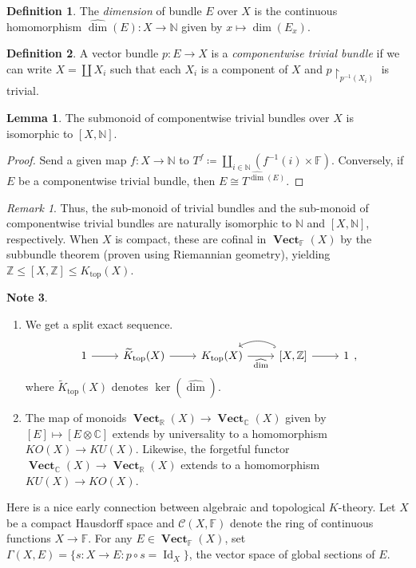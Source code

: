 \documentclass[10pt,letterpaper,cm]{nupset}
\theoremstyle{definition}
\newtheorem{definition}{Definition}
\newtheorem{note}[definition]{Note}
\theoremstyle{theorem}
\newtheorem{lemma}[theorem]{Lemma}
\theoremstyle{remark}
\newtheorem{remark}{Remark}
\newcommand{\C}{\mathbb C}
\newcommand{\F}{\mathbb F}
\newcommand{\N}{\mathbb N}
\newcommand{\R}{\mathbb R}
\newcommand{\Z}{\mathbb Z}
\newcommand{\1}{\mathbf{1}}
\newcommand{\0}{\vec 0}
\DeclareMathOperator{\id}{Id}
\DeclareMathOperator{\vect}{\mathbf{Vect}}
\DeclareMathOperator{\topp}{\mathrm{top}}
\begin{document}
\begin{definition}
The \textit{dimension} of bundle $E$ over $X$ is the continuous homomorphism $\widehat{\dim}(E) : X \to \N$ given by $x \mapsto \dim(E_x)$.
\end{definition}

\begin{definition}
A vector bundle $p: E \to X$ is a \textit{componentwise trivial bundle} if we can write $X =\coprod X_i$ such that each $X_i$ is a component of $X$ and $p\restriction_{p^{{-}1}(X_i)}$ is trivial. 
\end{definition}
\begin{lemma}
The submonoid of componentwise trivial bundles over $X$ is isomorphic to $[X, \N]$.
\end{lemma}
\begin{proof}
Send a given map $f: X \to \N$ to $T^f \coloneqq \coprod_{i \in \N} (f^{{-}1}(i) \times \F)$. Conversely, if $E$ be a componentwise trivial bundle, then $E \cong T^{\widehat{\dim}(E)}$.
\end{proof}

\begin{remark}
Thus, the sub-monoid  of trivial bundles and the sub-monoid of componentwise trivial bundles are naturally isomorphic to $\N$ and $[X, \N]$, respectively.  When $X$ is compact, these are cofinal in $\vect_{\F}(X)$ by the subbundle theorem (proven using Riemannian geometry), yielding $\Z \leq [X, \Z] \leq K_{\topp}(X)$.
\end{remark}

\begin{note} $ $
\begin{enumerate}
\item We get a split exact sequence. 
\[
\begin{tikzcd}
1 \arrow[r] & \widetilde{K}_{\topp}(X) \arrow[r] & K_{\topp}(X) \arrow[r, "\widehat{\dim}"'] & {[X, \mathbb Z]} \arrow[r] \arrow[l, hook, bend right] & 1
\end{tikzcd},
\] where $\widetilde{K}_{\topp}(X)$ denotes $\ker\left(\widehat{\dim}\right)$.
\item The map of monoids $\vect_{\R}(X) \to \vect_{\C}(X)$ given by $[E] \mapsto [E \otimes \C]$ extends by universality to a homomorphism $KO(X) \to KU(X)$. Likewise, the forgetful functor $\vect_{\C}(X) \to \vect_{\R}(X)$ extends to a homomorphism $KU(X) \to KO(X)$.
\end{enumerate}
\end{note}

Here is a nice early connection between algebraic and topological $K$-theory. Let $X$ be a compact Hausdorff space and $\mathcal C(X, \F)$ denote the ring of continuous functions $X \to \F$. For any $E \in \vect_{\F}(X)$, set $\Gamma(X, E) = \{s: X \to E : p \circ s = \id_X\}$, the vector space of global sections of $E$.
\end{document}
